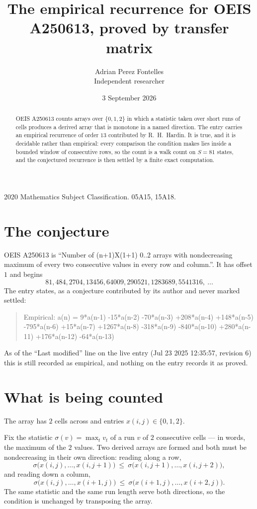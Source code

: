 \documentclass[11pt,a4paper]{article}
\title{The empirical recurrence for OEIS A250613, proved by transfer matrix}
\author{Adrian Perez Fontelles\\ \small Independent researcher}
\date{3 September 2026}
\theoremstyle{plain}
\theoremstyle{definition}
\begin{document}
\maketitle

\begin{abstract}
OEIS A250613 counts arrays over $\{0,1,2\}$ in which a statistic taken over short runs
of cells produces a derived array that is monotone in a named direction. The entry carries an
empirical recurrence of order $13$ contributed by R.~H.~Hardin. It is true, and it is
decidable rather than empirical: every comparison the condition makes lies inside a bounded
window of consecutive rows, so the count is a walk count on $S=81$ states, and the
conjectured recurrence is then settled by a finite exact computation.
\end{abstract}

\noindent\small 2020 Mathematics Subject Classification. 05A15, 15A18.\normalsize

\section{The conjecture}

OEIS A250613 is ``Number of (n+1)X(1+1) 0..2 arrays with nondecreasing maximum of every two consecutive values in every row and column.''. It has offset $1$ and begins
\[
81, 484, 2704, 13456, 64009, 290521, 1283689, 5541316,\ \dots
\]
The entry states, as a conjecture contributed by its author and never marked settled:
\begin{quote}
Empirical: a(n) = 9*a(n-1) -15*a(n-2) -70*a(n-3) +208*a(n-4) +148*a(n-5) -795*a(n-6) +15*a(n-7) +1267*a(n-8) -318*a(n-9) -840*a(n-10) +280*a(n-11) +176*a(n-12) -64*a(n-13)
\end{quote}
As of the ``Last modified'' line on the live entry (Jul 23 2025 12:35:57, revision 6) this is still
recorded as empirical, and nothing on the entry records it as proved.

\section{What is being counted}

The array has $2$ cells across and entries $x(i,j)\in\{0,1,2\}$.

Fix the statistic $\sigma(v)=\max_t v_t$ of a run $v$ of $2$ consecutive cells --- in words,
the maximum of the $2$ values. Two derived arrays are formed and both must be
nondecreasing in their own direction: reading along a row,
\[
\sigma\bigl(x(i,j),\dots,x(i,j{+}1)\bigr)\ \le\
\sigma\bigl(x(i,j{+}1),\dots,x(i,j{+}2)\bigr),
\]
and reading down a column,
\[
\sigma\bigl(x(i,j),\dots,x(i{+}1,j)\bigr)\ \le\
\sigma\bigl(x(i{+}1,j),\dots,x(i{+}2,j)\bigr).
\]
The same statistic and the same run length serve both directions, so the condition is
unchanged by transposing the array.
\end{document}
